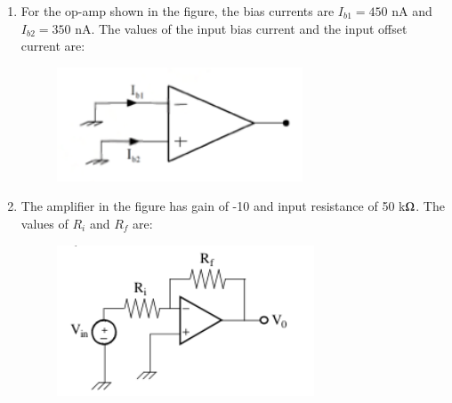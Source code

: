 \documentclass[journal,12pt,onecolumn]{IEEEtran}
\theoremstyle{remark}
\begin{document}
\begin{enumerate}
    
    
    \item For the op-amp shown in the figure, the bias currents are $I_{b1} = 450$ nA and $I_{b2} = 350$ nA. The values of the input bias current  and the input offset current  are:
    \begin{figure}[H]
        \centering
        \includegraphics[width=0.3\columnwidth]{q13}
        \caption*{}
        \label{fig:q13}
    \end{figure}

    \hfill{}
        \begin{enumerate}
        \end{enumerate}
    
    \item The amplifier in the figure has gain of -10 and input resistance of 50 k$\ohm$. The values of $R_i$ and $R_f$ are:
    \begin{figure}[H]
        \centering
        \includegraphics[width=0.4\columnwidth]{q14}
        \caption*{}
        \label{fig:q14}
    \end{figure}

    \hfill{}
        \begin{enumerate}
        \end{enumerate}
    

\end{enumerate}
\end{document}

